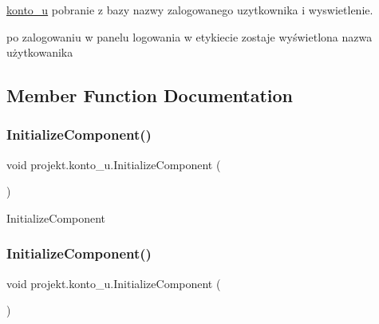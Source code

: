 \mbox{\hyperlink{classprojekt_1_1konto__u}{konto\+\_\+u}} pobranie z bazy nazwy zalogowanego uzytkownika i wyswietlenie. 

po zalogowaniu w panelu logowania w etykiecie zostaje wyświetlona nazwa użytkowanika

\subsection{Member Function Documentation}
\mbox{\label{classprojekt_1_1konto__u_aba94445ce67074714f9c38935885c165}} 
\subsubsection{\texorpdfstring{Initialize\+Component()}{InitializeComponent()}\hspace{0.1cm}{\footnotesize\ttfamily [1/9]}}
{\footnotesize\ttfamily void projekt.\+konto\+\_\+u.\+Initialize\+Component (\begin{DoxyParamCaption}{ }\end{DoxyParamCaption})\hspace{0.3cm}{\ttfamily [inline]}}



Initialize\+Component 

\mbox{\label{classprojekt_1_1konto__u_aba94445ce67074714f9c38935885c165}} 
\subsubsection{\texorpdfstring{Initialize\+Component()}{InitializeComponent()}\hspace{0.1cm}{\footnotesize\ttfamily [2/9]}}
{\footnotesize\ttfamily void projekt.\+konto\+\_\+u.\+Initialize\+Component (\begin{DoxyParamCaption}{ }\end{DoxyParamCaption})\hspace{0.3cm}{\ttfamily [inline]}}



